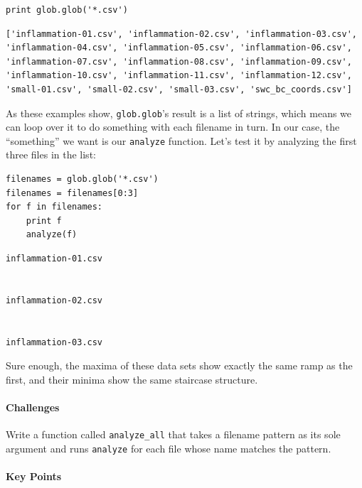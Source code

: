 \documentclass{book}
\begin{document}
\begin{verbatim}
print glob.glob('*.csv')
\end{verbatim}

\begin{verbatim}
['inflammation-01.csv', 'inflammation-02.csv', 'inflammation-03.csv', 'inflammation-04.csv', 'inflammation-05.csv', 'inflammation-06.csv', 'inflammation-07.csv', 'inflammation-08.csv', 'inflammation-09.csv', 'inflammation-10.csv', 'inflammation-11.csv', 'inflammation-12.csv', 'small-01.csv', 'small-02.csv', 'small-03.csv', 'swc_bc_coords.csv']
\end{verbatim}

As these examples show, \texttt{glob.glob}'s result is a list of
strings, which means we can loop over it to do something with each
filename in turn. In our case, the ``something'' we want is our
\texttt{analyze} function. Let's test it by analyzing the first three
files in the list:

\begin{verbatim}
filenames = glob.glob('*.csv')
filenames = filenames[0:3]
for f in filenames:
    print f
    analyze(f)
\end{verbatim}

\begin{verbatim}
inflammation-01.csv


inflammation-02.csv


inflammation-03.csv

\end{verbatim}

Sure enough, the maxima of these data sets show exactly the same ramp as
the first, and their minima show the same staircase structure.

\mbox{}\paragraph{Challenges}

\begin{swcenumerate}
\item
  Write a function called \texttt{analyze\_all} that takes a filename
  pattern as its sole argument and runs \texttt{analyze} for each file
  whose name matches the pattern.
\end{swcenumerate}

\mbox{}\paragraph{Key Points}
\end{document}
